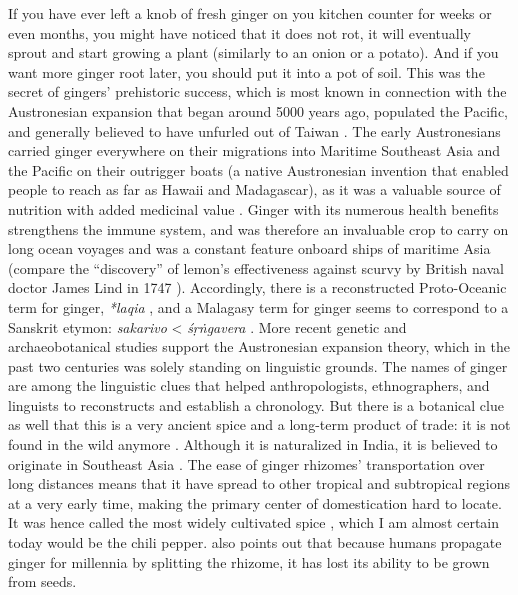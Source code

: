 If you have ever left a knob of fresh ginger on you kitchen counter for weeks or even months, you might have noticed that it does not rot, it will eventually sprout and start growing a plant (similarly to an onion or a potato). And if you want more ginger root later, you should put it into a pot of soil. This was the secret of gingers' prehistoric success, which is most known in connection with the Austronesian expansion that began around 5000 years ago, populated the Pacific, and generally believed to have unfurled out of Taiwan \autocite{mirabal_ascertaining_2013}. The early Austronesians carried ginger everywhere on their migrations into Maritime Southeast Asia and the Pacific on their outrigger boats (a native Austronesian invention that enabled people to reach as far as Hawaii and Madagascar), as it was a valuable source of nutrition with added medicinal value \autocite[see][21-25]{dalby_dangerous_2000}. Ginger with its numerous health benefits strengthens the immune system, and was therefore an invaluable crop to carry on long ocean voyages and was a constant feature onboard ships of maritime Asia (compare the ``discovery'' of lemon's effectiveness against scurvy by British naval doctor James Lind in 1747 \autocite{allan_finding_2021}). Accordingly, there is a reconstructed Proto-Oceanic term for ginger, \textit{*laqia} \autocite[52]{bellwood_austronesians_2006}, and a Malagasy term for ginger seems to correspond to a Sanskrit etymon: \textit{sakarivo} < \textit{śṛṅgavera} \autocite[41]{adelaar_malay_1994}. More recent genetic and archaeobotanical studies support the Austronesian expansion theory, which in the past two centuries was solely standing on linguistic grounds. The names of ginger are among the linguistic clues that helped anthropologists, ethnographers, and linguists to reconstructs and establish a chronology. But there is a botanical clue as well that this is a very ancient spice and a long-term product of trade: it is not found in the wild anymore \autocite{ravindran_ginger_2005}. Although it is naturalized in India, it is believed to originate in Southeast Asia \autocite{ravindran_ginger_2005}. The ease of ginger rhizomes' transportation over long distances means that it have spread to other tropical and subtropical regions at a very early time, making the primary center of domestication hard to locate. It was hence called the most widely cultivated spice \autocite{lawrence_major_1984}, which I am almost certain today would be the chili pepper. \textcite{dalby_dangerous_2000} also points out that because humans propagate ginger for millennia by splitting the rhizome, it has lost its ability to be grown from seeds.

